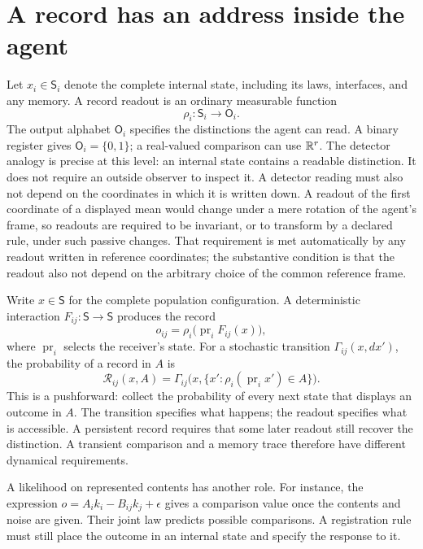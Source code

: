 \section{A record has an address inside the agent}

Let $x_i\in\mathsf S_i$ denote the complete internal state, including its laws, interfaces, and any memory. A record readout is an ordinary measurable function
\begin{equation}
\rho_i:\mathsf S_i\longrightarrow\mathsf O_i.
\label{comp:eq-readout}
\end{equation}
The output alphabet $\mathsf O_i$ specifies the distinctions the agent can read. A binary register gives $\mathsf O_i=\{0,1\}$; a real-valued comparison can use $\mathbb R^r$. The detector analogy is precise at this level: an internal state contains a readable distinction. It does not require an outside observer to inspect it. A detector reading must also not depend on the coordinates in which it is written down. A readout of the first coordinate of a displayed mean would change under a mere rotation of the agent's frame, so readouts are required to be invariant, or to transform by a declared rule, under such passive changes. That requirement is met automatically by any readout written in reference coordinates; the substantive condition is that the readout also not depend on the arbitrary choice of the common reference frame.

Write $x\in\mathsf S$ for the complete population configuration. A deterministic interaction $F_{ij}:\mathsf S\to\mathsf S$ produces the record
\begin{equation}
o_{ij}=\rho_i\bigl(\operatorname{pr}_i F_{ij}(x)\bigr),
\label{comp:eq-deterministic-record}
\end{equation}
where $\operatorname{pr}_i$ selects the receiver's state. For a stochastic transition $\Gamma_{ij}(x,dx')$, the probability of a record in $A$ is
\begin{equation}
\mathcal R_{ij}(x,A)
=\Gamma_{ij}\bigl(x,\{x':\rho_i(\operatorname{pr}_i x')\in A\}\bigr).
\label{comp:eq-record-law}
\end{equation}
This is a pushforward: collect the probability of every next state that displays an outcome in $A$. The transition specifies what happens; the readout specifies what is accessible. A persistent record requires that some later readout still recover the distinction. A transient comparison and a memory trace therefore have different dynamical requirements.

A likelihood on represented contents has another role. For instance, the expression $o=A_i k_i-B_{ij}k_j+\epsilon$ gives a comparison value once the contents and noise are given. Their joint law predicts possible comparisons. A registration rule must still place the outcome in an internal state and specify the response to it.

